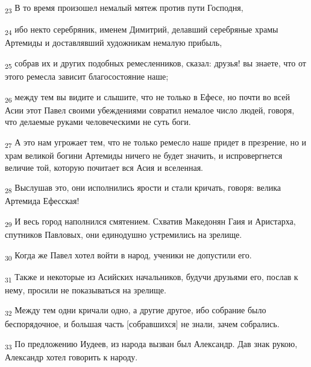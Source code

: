 \begin{tcolorbox}
\textsubscript{23} В то время произошел немалый мятеж против пути Господня,
\end{tcolorbox}
\begin{tcolorbox}
\textsubscript{24} ибо некто серебряник, именем Димитрий, делавший серебряные храмы Артемиды и доставлявший художникам немалую прибыль,
\end{tcolorbox}
\begin{tcolorbox}
\textsubscript{25} собрав их и других подобных ремесленников, сказал: друзья! вы знаете, что от этого ремесла зависит благосостояние наше;
\end{tcolorbox}
\begin{tcolorbox}
\textsubscript{26} между тем вы видите и слышите, что не только в Ефесе, но почти во всей Асии этот Павел своими убеждениями совратил немалое число людей, говоря, что делаемые руками человеческими не суть боги.
\end{tcolorbox}
\begin{tcolorbox}
\textsubscript{27} А это нам угрожает тем, что не только ремесло наше придет в презрение, но и храм великой богини Артемиды ничего не будет значить, и испровергнется величие той, которую почитает вся Асия и вселенная.
\end{tcolorbox}
\begin{tcolorbox}
\textsubscript{28} Выслушав это, они исполнились ярости и стали кричать, говоря: велика Артемида Ефесская!
\end{tcolorbox}
\begin{tcolorbox}
\textsubscript{29} И весь город наполнился смятением. Схватив Македонян Гаия и Аристарха, спутников Павловых, они единодушно устремились на зрелище.
\end{tcolorbox}
\begin{tcolorbox}
\textsubscript{30} Когда же Павел хотел войти в народ, ученики не допустили его.
\end{tcolorbox}
\begin{tcolorbox}
\textsubscript{31} Также и некоторые из Асийских начальников, будучи друзьями его, послав к нему, просили не показываться на зрелище.
\end{tcolorbox}
\begin{tcolorbox}
\textsubscript{32} Между тем одни кричали одно, а другие другое, ибо собрание было беспорядочное, и большая часть [собравшихся] не знали, зачем собрались.
\end{tcolorbox}
\begin{tcolorbox}
\textsubscript{33} По предложению Иудеев, из народа вызван был Александр. Дав знак рукою, Александр хотел говорить к народу.
\end{tcolorbox}
